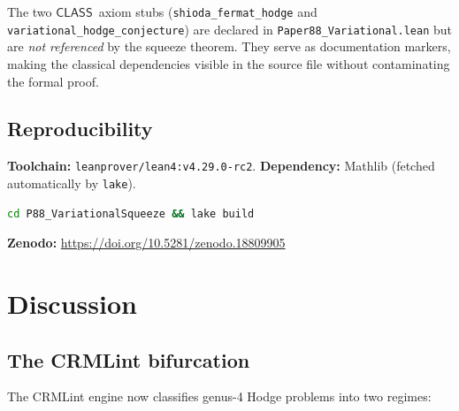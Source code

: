 \documentclass[11pt]{article}
\theoremstyle{plain}
\theoremstyle{definition}
\theoremstyle{remark}
\newcommand{\CLASS}{\ensuremath{\mathsf{CLASS}}}
\begin{document}
The two \CLASS\ axiom stubs (\texttt{shioda\_fermat\_hodge} and
\texttt{variational\_hodge\_conjecture}) are declared in
\texttt{Paper88\_Variational.lean} but are \emph{not referenced}
by the squeeze theorem.  They serve as documentation markers,
making the classical dependencies visible in the source file
without contaminating the formal proof.

\subsection{Reproducibility}

\textbf{Toolchain:} \texttt{leanprover/lean4:v4.29.0-rc2}.
\textbf{Dependency:} Mathlib (fetched automatically by \texttt{lake}).

\begin{lstlisting}[language=bash,style=leanstyle,keywords={}]
cd P88_VariationalSqueeze && lake build
\end{lstlisting}

\noindent
\textbf{Zenodo:} \url{https://doi.org/10.5281/zenodo.18809905}

\section{Discussion}
\label{sec:discussion}

\subsection{The CRMLint bifurcation}

The CRMLint engine now classifies genus-4 Hodge problems into
two regimes:
\end{document}
